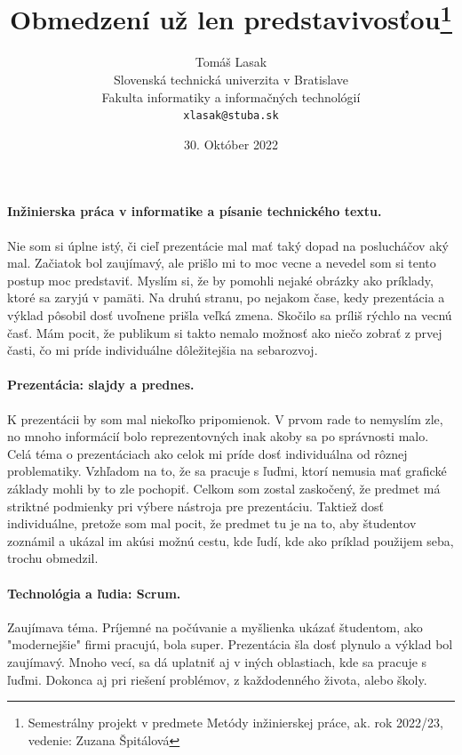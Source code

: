 \documentclass[10pt,oneside,slovak,a4paper]{article}
\title{Obmedzení už len predstavivosťou\thanks{Semestrálny projekt v predmete Metódy inžinierskej práce, ak. rok 2022/23, vedenie: Zuzana Špitálová}}
\author{Tomáš Lasak\\[2pt]
	{\small Slovenská technická univerzita v Bratislave}\\
	{\small Fakulta informatiky a informačných technológií}\\
	{\small \texttt{xlasak@stuba.sk}}
	}
\date{\small 30. Október 2022}
\begin{document}
\maketitle

\paragraph{Inžinierska práca v informatike a písanie technického textu.}

Nie som si úplne istý, či cieľ prezentácie mal mať taký dopad na poslucháčov aký mal.
Začiatok bol zaujímavý, ale prišlo mi to moc vecne a nevedel som si tento postup moc predstaviť.
Myslím si, že by pomohli nejaké obrázky ako príklady, ktoré sa zaryjú v pamäti.
Na druhú stranu, po nejakom čase, kedy prezentácia a výklad pôsobil dosť uvoľnene prišla veľká zmena.
Skočilo sa príliš rýchlo na vecnú časť.
Mám pocit, že publikum si takto nemalo možnosť ako niečo zobrať z prvej časti, čo mi príde individuálne dôležitejšia na sebarozvoj.

\paragraph{Prezentácia: slajdy a prednes.}

K prezentácii by som mal niekoľko pripomienok.
V prvom rade to nemyslím zle, no mnoho informácií bolo reprezentovných inak akoby sa po správnosti malo.
Celá téma o prezentáciach ako celok mi príde dosť individuálna od rôznej problematiky.
Vzhľadom na to, že sa pracuje s ľuďmi, ktorí nemusia mať grafické základy mohli by to zle pochopiť.
Celkom som zostal zaskočený, že predmet má striktné podmienky pri výbere nástroja pre prezentáciu.
Taktiež dosť individuálne, pretože som mal pocit, že predmet tu je na to, aby študentov zoznámil a ukázal im akúsi možnú cestu,
kde ľudí, kde ako príklad použijem seba, trochu obmedzil.

\paragraph{Technológia a ľudia: Scrum.}

Zaujímava téma. Príjemné na počúvanie a myšlienka ukázať študentom, ako "modernejšie" firmi pracujú, bola super.
Prezentácia šla dosť plynulo a výklad bol zaujímavý.
Mnoho vecí, sa dá uplatniť aj v iných oblastiach, kde sa pracuje s ľuďmi.
Dokonca aj pri riešení problémov, z každodenného života, alebo školy.

\pagebreak
\end{document}
